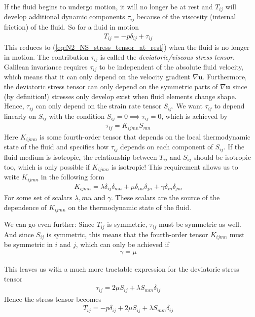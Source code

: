 \documentclass[a4paper, 12pt]{article}
\numberwithin{equation}{subsubsection}
\begin{document}
If the fluid begins to undergo motion, it will no longer be at rest and $T_{ij}$ will develop additional dynamic components $\tau_{ij}$ because of the viscosity (internal friction) of the fluid. So for a fluid in motion
\begin{align}
	T_{ij} = - p \delta_{ij} + \tau_{ij}
\end{align}
This reduces to (\ref{eq:N2_NS_stress_tensor_at_rest}) when the fluid is no longer in motion. The contribution $\tau_{ij}$ is called the \textit{deviatoric/viscous stress tensor}. Galilean invariance requires $\tau_{ij}$ to be independent of the absolute fluid velocity, which means that it can only depend on the velocity gradient $\nabla \mathbf{u}$. Furthermore, the deviatoric stress tensor can only depend on the symmetric parts of $\nabla \mathbf{u}$ since (by definition!) stresses only develop exist when fluid elements change shape. Hence, $\tau_{ij}$ can only depend on the strain rate tensor $S_{ij}$. We want $\tau_{ij}$ to depend linearly on $S_{ij}$ with the condition $S_{ij} = 0 \implies \tau_{ij} = 0$, which is achieved by
\begin{align}
\tau_{ij} = K_{ijmn} S_{mn}
\end{align}
Here $K_{ijmn}$ is some fourth-order tensor that depends on the local thermodynamic state of the fluid and specifies how $\tau_{ij}$ depends on each component of $S_{ij}$. If the fluid medium is isotropic, the relationship between $T_{ij}$ and $S_{ij}$ should be isotropic too, which is only possible if $K_{ijmn}$ is isotropic! This requirement allows us to write $K_{ijmn}$ in the following form
\begin{align}
	K_{ijmn} = \lambda \delta_{ij}\delta_{mn} + \mu \delta_{im}\delta_{jn} + \gamma \delta_{in}\delta_{jm}
\end{align}
For some set of scalars $\lambda, mu$ and $\gamma$. These scalars are the source of the dependence of $K_{ijmn}$ on the thermodynamic state of the fluid.

We can go even further: Since $T_{ij}$ is symmetric, $\tau_{ij}$ must be symmetric as well. And since $S_{ij}$ is symmetric, this means that the fourth-order tensor $K_{ijmn}$ must be symmetric in $i$ and $j$, which can only be achieved if
\begin{align}
	\gamma = \mu
\end{align}

This leaves us with a much more tractable expression for the deviatoric stress tensor
\begin{align}
	\tau_{ij} = 2 \mu S_{ij} + \lambda S_{mm} \delta_{ij} \label{eq:N2_NS_deviatoric_stress_tensor}
\end{align}
Hence the stress tensor becomes
\begin{align}
	T_{ij} = - p \delta_{ij} + 2 \mu S_{ij} + \lambda S_{mm} \delta_{ij}
\end{align}
\end{document}
